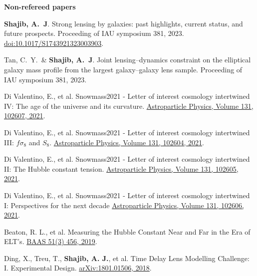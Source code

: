 \documentclass[margin, line]{res}
\begin{document}
\begin{resume}
\textbf{Non-refereed papers}
\begin{etaremune}
	\item \textbf{Shajib, A.~J}. Strong lensing by galaxies: past highlights, current status, and future prospects. Proceeding of IAU symposium 381, 2023. \href{https://arxiv.org/abs/2310.07695}{doi:10.1017/S1743921323003903}.
	\item Tan, C.~Y.\mentee~\& \textbf{Shajib, A.~J}. Joint lensing--dynamics constraint on the elliptical galaxy mass profile from the largest galaxy--galaxy lens sample. Proceeding of IAU symposium 381, 2023.
	\item Di Valentino, E., et al. Snowmass2021 - Letter of interest cosmology intertwined IV: The age of the universe and its curvature. \href{https://www.sciencedirect.com/science/article/abs/pii/S0927650521000517}{Astroparticle Physics, Volume 131, 102607, 2021}.
	\item Di Valentino, E., et al. Snowmass2021 - Letter of interest cosmology intertwined III: $f\sigma_8$ and $S_8$. \href{https://www.sciencedirect.com/science/article/abs/pii/S0927650521000487}{Astroparticle Physics, Volume 131, 102604, 2021}.
	\item Di Valentino, E., et al. Snowmass2021 - Letter of interest cosmology intertwined II: The Hubble constant tension. \href{https://www.sciencedirect.com/science/article/abs/pii/S0927650521000499}{Astroparticle Physics, Volume 131, 102605, 2021}.
	\item Di Valentino, E., et al. Snowmass2021 - Letter of interest cosmology intertwined I: Perspectives for the next decade \href{https://www.sciencedirect.com/science/article/abs/pii/S0927650521000505}{Astroparticle Physics, Volume 131, 102606, 2021}.
	\item Beaton, R. L., et al. Measuring the Hubble Constant Near and Far in the Era of ELT's. \href{https://ui.adsabs.harvard.edu/abs/2019BAAS...51c.456B/abstract}{BAAS 51(3) 456, 	2019}.
	\item Ding, X., Treu, T., {\bf Shajib, A. J.}, et al. Time Delay Lens Modelling Challenge: I. Experimental Design. \href{https://arxiv.org/abs/1801.01506}{arXiv:1801.01506, 2018}.
\end{etaremune}







\end{resume}
\end{document}
